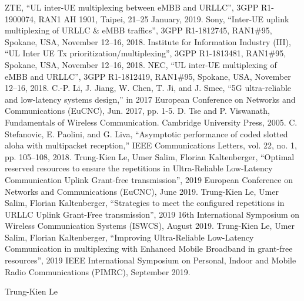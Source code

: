 \documentclass{ieeeaccess}
\begin{document}
\begin{thebibliography}{00}
 ZTE, ``UL inter-UE multiplexing between eMBB and URLLC'', 3GPP R1-1900074, RAN1 AH 1901, Taipei,  21--25 January, 2019.
  Sony, ``Inter-UE uplink multiplexing of URLLC \& eMBB traffics'', 3GPP R1-1812745, RAN1\#95, Spokane, USA, November 12--16, 2018.
  Institute for Information Industry (III), ``UL Inter UE Tx prioritization/multiplexing'', 3GPP R1-1813481, RAN1\#95, Spokane, USA, November 12--16, 2018.
  NEC, ``UL inter-UE multiplexing of eMBB and URLLC'', 3GPP R1-1812419, RAN1\#95, Spokane, USA, November 12--16, 2018.
  C.-P. Li, J. Jiang, W. Chen, T. Ji, and J. Smee, ``5G ultra-reliable and low-latency systems design,'' in 2017 European Conference on Networks and Communications (EuCNC), Jun. 2017, pp. 1-5. 
 D. Tse and P. Viswanath, Fundamentals of Wireless Communication. Cambridge University Press, 2005. 
 C. Stefanovic, E. Paolini, and G. Liva, ``Asymptotic performance of coded slotted aloha with multipacket reception,'' IEEE Communications Letters, vol. 22, no. 1, pp. 105--108, 2018.
 Trung-Kien Le, Umer Salim, Florian Kaltenberger, ``Optimal reserved resources to ensure the repetitions in Ultra-Reliable Low-Latency Communication Uplink Grant-free transmission'',  2019 European Conference on Networks and Communications (EuCNC), June 2019.
 Trung-Kien Le, Umer Salim, Florian Kaltenberger, ``Strategies to meet the configured repetitions in URLLC Uplink Grant-Free transmission'',  2019 16th International Symposium on Wireless Communication Systems (ISWCS), August 2019.
 Trung-Kien Le, Umer Salim, Florian Kaltenberger, ``Improving Ultra-Reliable Low-Latency Communication in multiplexing with Enhanced Mobile Broadband in grant-free resources'', 2019 IEEE International Symposium on Personal, Indoor and Mobile Radio Communications (PIMRC), September 2019.
\end{thebibliography}


\begin{IEEEbiography}{Trung-Kien Le} 
\end{IEEEbiography}
\end{document}
